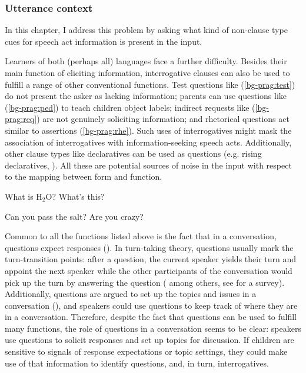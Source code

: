 \subsubsection{Utterance context}
In this chapter, I address this problem by
asking what kind of non-clause type cues for speech act information is present in the input.

Learners of both (perhaps all) languages face a further difficulty. Besides their main function of eliciting information, interrogative clauses can also be used to fulfill a range of other conventional functions. Test questions like (\ref{bg-prag:test}) do not present the asker as lacking information; parents can use questions like (\ref{bg-prag:ped}) to teach children object labels; indirect requests like (\ref{bg-prag:req}) are not genuinely soliciting information; and rhetorical questions act similar to assertions (\ref{bg-prag:rhe}). Such uses of interrogatives might mask the association of interrogatives with information-seeking speech acts. Additionally, other clause types like declaratives can be used as questions (e.g. rising declaratives, \citealt{gunlogson2004,gunlogson2008,jeong2018,rudin2018}). All these are potential sources of noise in the input with respect to the mapping between form and function.

\bxl\label{bg-prag:test}
What is H$_{2}$O?		\hfill {}
\ex \label{bg-prag:ped}
What's this?	\hfill {}
\exl
\eex

\bex{}
\bxl\label{bg-prag:req}
Can you pass the salt?			\hfill {}
\ex \label{bg-prag:rhe}
Are you crazy?	\hfill {}
\exl
\eex


Common to all the functions listed above is the fact that in a conversation, questions expect responses (\citealt{duncan1972turn}). In turn-taking theory, questions usually mark the turn-transition points: after a question, the current speaker yields their turn and appoint the next speaker while the other participants of the conversation would pick up the turn by answering the question (\citealt{kendon1967gaze, argyle1972gaze, levinson1983, tice2011turn} among others, see \citealt{enfield2010} for a survey).  Additionally, questions are argued to set up the topics and issues in a conversation (\citealt{roberts2012,farkasbruce2010}), and speakers could use questions to keep track of where they are in a conversation. Therefore, despite the fact that questions can be used to fulfill many functions, the role of questions in a conversation seems to be clear: speakers use questions to solicit responses and set up topics for discussion. If children are sensitive to signals of response expectations or topic settings, they could make use of that information to identify questions, and, in turn, interrogatives. 


